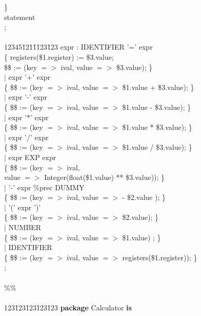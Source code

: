 \begin{tabbing}
\>\>\>\>               \}\\
\>\>\>             statement\\
\>\>\>           ;\\
\\
12345\=12\=1\=1\=123\=123 \kill
expr  \>\>:\> IDENTIFIER '=' expr\\
\>\>\>           \{ registers(\$1.register) := \$3.value;\\
\>\>\>\>    \$\$ := (key $=>$ ival, value $=>$ \$3.value); \}\\
\>       $|$ expr '+' expr\\
\>\>\>     \{ \$\$ := (key $=>$ ival, value $=>$ \$1.value + \$3.value); \}\\
\>       $|$ expr '-' expr\\
\>\>\>        \{ \$\$ := (key $=>$ ival, value $=>$ \$1.value - \$3.value); \}\\
\>       $|$ expr '*' expr\\
\>\>\>        \{ \$\$ := (key $=>$ ival, value $=>$ \$1.value * \$3.value); \}\\
\>       $|$ expr '/' expr\\
\>\>\>        \{ \$\$ := (key $=>$ ival, value $=>$ \$1.value / \$3.value); \}\\
\>       $|$ expr EXP expr\\
\>\>\>        \{ \$\$ := (key $=>$ ival,\\
\>\>\>              value $=>$ Integer(float(\$1.value) ** \$3.value)); \}\\
\>       $|$ '-' expr  \%prec DUMMY\\
\>\>\>           \{ \$\$ := (key $=>$ ival, value $=>$ - \$2.value ); \}\\
\>       $|$ '(' expr ')'\\
\>\>\>           \{ \$\$ := (key $=>$ ival, value $=>$ \$2.value); \}\\
\>       $|$ NUMBER\\
\>\>\>           \{ \$\$ := (key $=>$ ival, value $=>$ \$1.value) ; \}\\
\>       $|$ IDENTIFIER\\
\>\>\>           \{ \$\$ := (key $=>$ ival, value  $=>$ registers(\$1.register)); \}\\
\>       ;\\
\\
\%\%\\
\\
123\=123\=123\=123\=123 \kill
{\bf package} Calculator {\bf is}\\

\end{tabbing}
